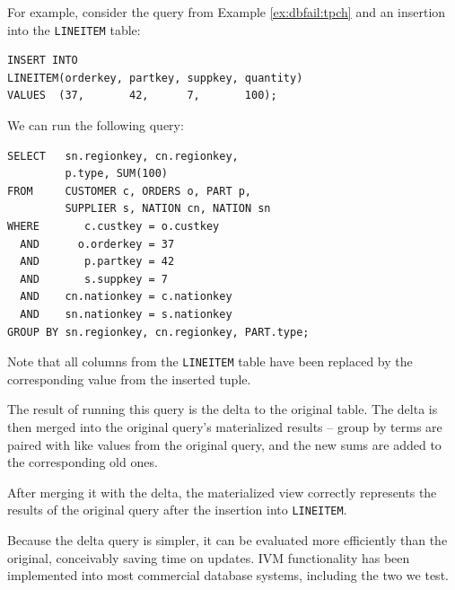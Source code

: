 \begin{example}
For example, consider the query from Example \ref{ex:dbfail:tpch} and an insertion into the {\tt LINEITEM} table:
\begin{verbatim}
INSERT INTO 
LINEITEM(orderkey, partkey, suppkey, quantity)
VALUES  (37,       42,      7,       100);
\end{verbatim}

We can run the following query:
\begin{verbatim}
SELECT   sn.regionkey, cn.regionkey,
         p.type, SUM(100)
FROM     CUSTOMER c, ORDERS o, PART p, 
         SUPPLIER s, NATION cn, NATION sn
WHERE       c.custkey = o.custkey
  AND      o.orderkey = 37
  AND       p.partkey = 42
  AND       s.suppkey = 7
  AND    cn.nationkey = c.nationkey
  AND    sn.nationkey = s.nationkey
GROUP BY sn.regionkey, cn.regionkey, PART.type;
\end{verbatim}

Note that all columns from the {\tt LINEITEM} table have been replaced by the corresponding value from the inserted tuple.  

The result of running this query is the delta to the original table.  The delta is then merged into the original query's materialized results -- group by terms are paired with like values from the original query, and the new sums are added to the corresponding old ones.  

After merging it with the delta, the materialized view correctly represents the results of the original query after the insertion into {\tt LINEITEM}.
\end{example}

Because the delta query is simpler, it can be evaluated more efficiently than the original, conceivably saving time on updates.  IVM functionality has been implemented into most commercial database systems, including the two we test.

